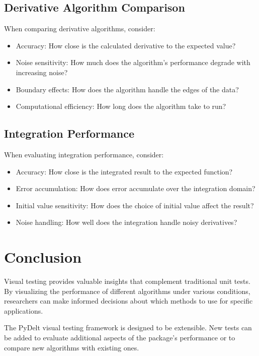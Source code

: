 \documentclass{article}
\begin{document}
\subsection{Derivative Algorithm Comparison}

When comparing derivative algorithms, consider:
\begin{itemize}
    \item Accuracy: How close is the calculated derivative to the expected value?
    \item Noise sensitivity: How much does the algorithm's performance degrade with increasing noise?
    \item Boundary effects: How does the algorithm handle the edges of the data?
    \item Computational efficiency: How long does the algorithm take to run?
\end{itemize}

\subsection{Integration Performance}

When evaluating integration performance, consider:
\begin{itemize}
    \item Accuracy: How close is the integrated result to the expected function?
    \item Error accumulation: How does error accumulate over the integration domain?
    \item Initial value sensitivity: How does the choice of initial value affect the result?
    \item Noise handling: How well does the integration handle noisy derivatives?
\end{itemize}

\section{Conclusion}

Visual testing provides valuable insights that complement traditional unit tests. By visualizing the performance of different algorithms under various conditions, researchers can make informed decisions about which methods to use for specific applications.

The PyDelt visual testing framework is designed to be extensible. New tests can be added to evaluate additional aspects of the package's performance or to compare new algorithms with existing ones.
\end{document}
